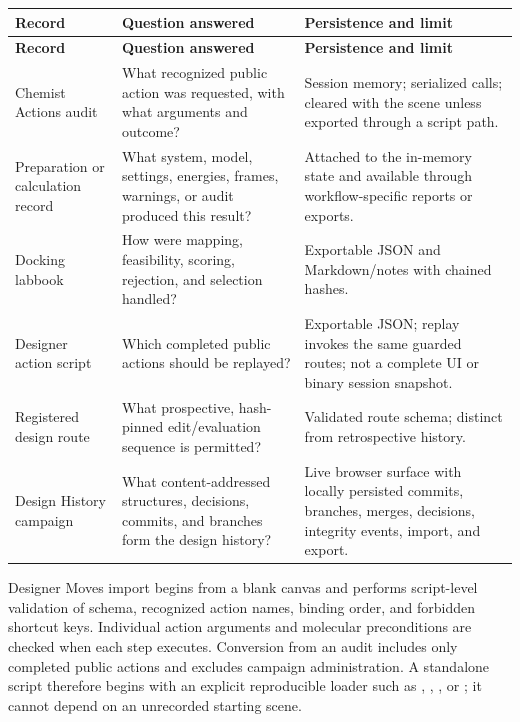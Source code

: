 \documentclass[11pt]{article}
\begin{document}
\begingroup
\footnotesize
\begin{longtable}{@{}p{1.23in}p{2.76in}p{2.61in}@{}}
\toprule
\textbf{Record} & \textbf{Question answered} & \textbf{Persistence and limit}\\
\midrule
\endfirsthead
\toprule
\textbf{Record} & \textbf{Question answered} & \textbf{Persistence and limit}\\
\midrule
\endhead
Chemist Actions audit & What recognized public action was requested, with what arguments and outcome? & Session memory; serialized calls; cleared with the scene unless exported through a script path.\\
Preparation or calculation record & What system, model, settings, energies, frames, warnings, or audit produced this result? & Attached to the in-memory state and available through workflow-specific reports or exports.\\
Docking labbook & How were mapping, feasibility, scoring, rejection, and selection handled? & Exportable JSON and Markdown/notes with chained hashes.\\
Designer action script & Which completed public actions should be replayed? & Exportable JSON; replay invokes the same guarded routes; not a complete UI or binary session snapshot.\\
Registered design route & What prospective, hash-pinned edit/evaluation sequence is permitted? & Validated route schema; distinct from retrospective history.\\
Design History campaign & What content-addressed structures, decisions, commits, and branches form the design history? & Live browser surface with locally persisted commits, branches, merges, decisions, integrity events, import, and export.\\
\bottomrule
\end{longtable}
\endgroup


Designer Moves import begins from a blank canvas and performs script-level validation of schema, recognized action names, binding order, and forbidden shortcut keys. Individual action arguments and molecular preconditions are checked when each step executes. Conversion from an audit includes only completed public actions and excludes campaign administration. A standalone script therefore begins with an explicit reproducible loader such as , , , or ; it cannot depend on an unrecorded starting scene.
\end{document}
